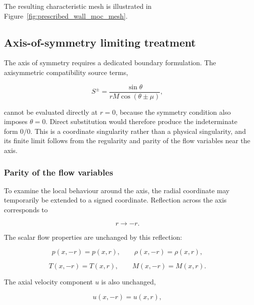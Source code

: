 The resulting characteristic mesh is illustrated in
Figure~\ref{fig:prescribed_wall_moc_mesh}.



\subsection{Axis-of-symmetry limiting treatment}
\label{sec:moc_axis_treatment}

The axis of symmetry requires a dedicated boundary formulation. The
axisymmetric compatibility source terms,

\begin{equation}
S^\pm =
\frac{\sin\theta}
{rM\cos(\theta\pm\mu)},
\label{eq:moc_axisymmetric_source_recalled}
\end{equation}

cannot be evaluated directly at \(r=0\), because the symmetry condition
also imposes \(\theta=0\). Direct substitution would therefore produce
the indeterminate form \(0/0\). This is a coordinate singularity rather
than a physical singularity, and its finite limit follows from the
regularity and parity of the flow variables near the axis.

\subsubsection{Parity of the flow variables}

To examine the local behaviour around the axis, the radial coordinate
may temporarily be extended to a signed coordinate. Reflection across
the axis corresponds to

\begin{equation}
r\longrightarrow-r.
\end{equation}

The scalar flow properties are unchanged by this reflection:

\begin{equation}
p(x,-r)=p(x,r),
\qquad
\rho(x,-r)=\rho(x,r),
\end{equation}

\begin{equation}
T(x,-r)=T(x,r),
\qquad
M(x,-r)=M(x,r).
\end{equation}

The axial velocity component \(u\) is also unchanged,

\begin{equation}
u(x,-r)=u(x,r),
\end{equation}

